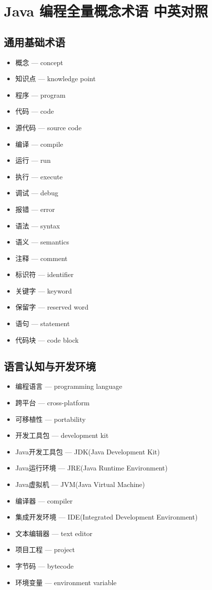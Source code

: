 
\section{Java 编程全量概念术语 中英对照}

\subsection{通用基础术语}
\begin{itemize}
\item 概念 — concept
\item 知识点 — knowledge point
\item 程序 — program
\item 代码 — code
\item 源代码 — source code
\item 编译 — compile
\item 运行 — run
\item 执行 — execute
\item 调试 — debug
\item 报错 — error
\item 语法 — syntax
\item 语义 — semantics
\item 注释 — comment
\item 标识符 — identifier
\item 关键字 — keyword
\item 保留字 — reserved word
\item 语句 — statement
\item 代码块 — code block
\end{itemize}

\subsection{语言认知与开发环境}
\begin{itemize}
\item 编程语言 — programming language
\item 跨平台 — cross-platform
\item 可移植性 — portability
\item 开发工具包 — development kit
\item Java开发工具包 — JDK(Java Development Kit)
\item Java运行环境 — JRE(Java Runtime Environment)
\item Java虚拟机 — JVM(Java Virtual Machine)
\item 编译器 — compiler
\item 集成开发环境 — IDE(Integrated Development Environment)
\item 文本编辑器 — text editor
\item 项目工程 — project
\item 字节码 — bytecode
\item 环境变量 — environment variable
\end{itemize}

